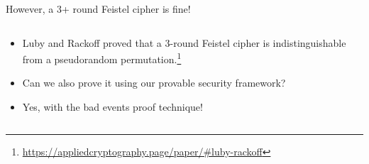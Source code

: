 \documentclass[aspectratio=169, lualatex, handout]{beamer}
\begin{document}
\begin{frame}{However, a 3+ round Feistel cipher is fine!}
	\begin{columns}[c]
		\begin{column}{0.4\textwidth}
			\begin{itemize}
				\item Luby and Rackoff proved that a 3-round Feistel cipher is indistinguishable from a pseudorandom permutation.\footnote{\url{https://appliedcryptography.page/paper/\#luby-rackoff}}
				\item Can we also prove it using our provable security framework?
				\item Yes, with the bad events proof technique!
			\end{itemize}
		\end{column}
		\begin{column}{0.6\textwidth}
			\begin{center}
			\end{center}
		\end{column}
	\end{columns}
\end{frame}
\end{document}

